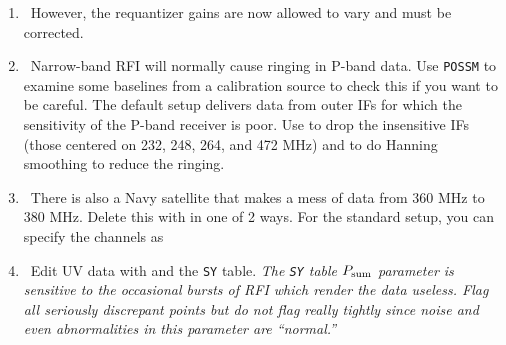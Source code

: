 \begin{enumerate}
\item\ However, the requantizer gains are now allowed to vary and must
  be corrected.

\vfill\eject
\item\ Narrow-band RFI will normally cause ringing in P-band data.
  Use {\tt POSSM} to examine some baselines from a calibration source
  to check this if you want to be careful.  The default setup delivers
  data from outer IFs for which the sensitivity of the P-band receiver
  is poor.  Use  to drop the insensitive IFs (those
  centered on 232, 248, 264, and 472 MHz) and to do Hanning smoothing
  to reduce the ringing. 

\item\ There is also a Navy satellite that makes a mess of data from
  360 MHz to 380 MHz.  Delete this with {\tt {}} in one of 2
  ways.  For the standard setup, you can specify the channels as

\item\ Edit UV data with {\tt {}} and the {\tt SY} table.
  {\it The {\tt SY} table $P_{\rm sum}$ parameter is sensitive to the
    occasional bursts of RFI which render the data useless.  Flag all
    seriously discrepant points but do not flag really tightly since
    noise and even abnormalities in this parameter are ``normal.''}


\end{enumerate}
